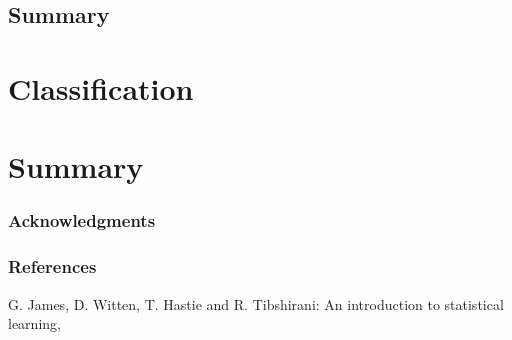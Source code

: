\documentclass{article} %
\begin{document}
\subsection{Summary}

\section{Classification}





\section{Summary}


\subsubsection*{Acknowledgments}

\subsubsection*{References}
G. James, D. Witten, T. Hastie and R. Tibshirani: An introduction to statistical learning,
\end{document}

